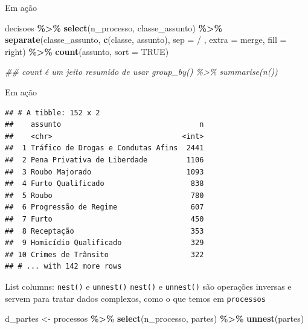 \documentclass[
  10pt,
  ignorenonframetext,
]{beamer}
\newenvironment{Shaded}{\begin{snugshade}}{\end{snugshade}}
\newcommand{\CommentTok}[1]{\textcolor[rgb]{0.56,0.35,0.01}{\textit{#1}}}
\newcommand{\DataTypeTok}[1]{\textcolor[rgb]{0.13,0.29,0.53}{#1}}
\newcommand{\KeywordTok}[1]{\textcolor[rgb]{0.13,0.29,0.53}{\textbf{#1}}}
\newcommand{\NormalTok}[1]{#1}
\newcommand{\OperatorTok}[1]{\textcolor[rgb]{0.81,0.36,0.00}{\textbf{#1}}}
\newcommand{\OtherTok}[1]{\textcolor[rgb]{0.56,0.35,0.01}{#1}}
\newcommand{\StringTok}[1]{\textcolor[rgb]{0.31,0.60,0.02}{#1}}
\begin{document}
\begin{frame}[fragile]{Em ação}
\protect\hypertarget{em-auxe7uxe3o}{}
\begin{Shaded}
\begin{Highlighting}[]
\NormalTok{decisoes }\OperatorTok{\%\textgreater{}\%}\StringTok{ }
\StringTok{  }\KeywordTok{select}\NormalTok{(n\_processo, classe\_assunto) }\OperatorTok{\%\textgreater{}\%}\StringTok{ }
\StringTok{  }\KeywordTok{separate}\NormalTok{(classe\_assunto, }\KeywordTok{c}\NormalTok{(}\StringTok{\textquotesingle{}classe\textquotesingle{}}\NormalTok{, }\StringTok{\textquotesingle{}assunto\textquotesingle{}}\NormalTok{), }\DataTypeTok{sep =} \StringTok{\textquotesingle{} / \textquotesingle{}}\NormalTok{, }
           \DataTypeTok{extra =} \StringTok{\textquotesingle{}merge\textquotesingle{}}\NormalTok{, }\DataTypeTok{fill =} \StringTok{\textquotesingle{}right\textquotesingle{}}\NormalTok{) }\OperatorTok{\%\textgreater{}\%}\StringTok{ }
\StringTok{  }\KeywordTok{count}\NormalTok{(assunto, }\DataTypeTok{sort =} \OtherTok{TRUE}\NormalTok{)}

\CommentTok{\#\# count é um jeito resumido de usar group\_by() \%\textgreater{}\% summarise(n())}
\end{Highlighting}
\end{Shaded}
\end{frame}

\begin{frame}[fragile]{Em ação}
\protect\hypertarget{em-auxe7uxe3o-1}{}
\begin{verbatim}
## # A tibble: 152 x 2
##    assunto                                n
##    <chr>                              <int>
##  1 Tráfico de Drogas e Condutas Afins  2441
##  2 Pena Privativa de Liberdade         1106
##  3 Roubo Majorado                      1093
##  4 Furto Qualificado                    838
##  5 Roubo                                780
##  6 Progressão de Regime                 607
##  7 Furto                                450
##  8 Receptação                           353
##  9 Homicídio Qualificado                329
## 10 Crimes de Trânsito                   322
## # ... with 142 more rows
\end{verbatim}
\end{frame}

\begin{frame}[fragile]{List columns: \texttt{nest()} e
\texttt{unnest()}}
\protect\hypertarget{list-columns-nest-e-unnest}{}
\texttt{nest()} e \texttt{unnest()} são operações inversas e servem para
tratar dados complexos, como o que temos em \texttt{processos}

\begin{Shaded}
\begin{Highlighting}[]
\NormalTok{d\_partes \textless{}{-}}\StringTok{ }\NormalTok{processos }\OperatorTok{\%\textgreater{}\%}\StringTok{ }
\StringTok{  }\KeywordTok{select}\NormalTok{(n\_processo, partes) }\OperatorTok{\%\textgreater{}\%}\StringTok{ }
\StringTok{  }\KeywordTok{unnest}\NormalTok{(partes)}
\end{Highlighting}
\end{Shaded}
\end{frame}
\end{document}
